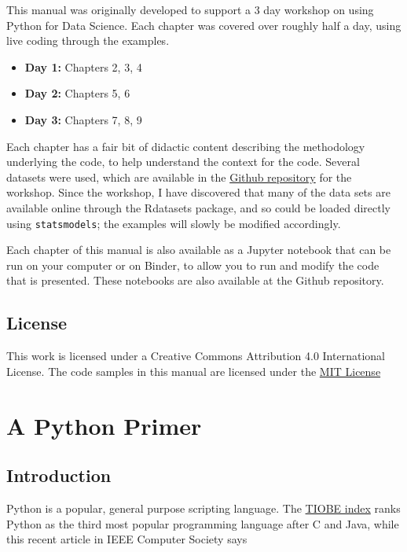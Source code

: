 \documentclass[
  letterpaper,
]{scrbook}
\providecommand{\tightlist}{%
  \setlength{\itemsep}{0pt}\setlength{\parskip}{0pt}}
\begin{document}
This manual was originally developed to support a 3 day workshop on using Python for Data Science. Each chapter was covered over roughly half a day, using live coding through the examples.

\begin{itemize}
\tightlist
\item
  \textbf{Day 1: } Chapters 2, 3, 4
\item
  \textbf{Day 2: } Chapters 5, 6
\item
  \textbf{Day 3: } Chapters 7, 8, 9
\end{itemize}

Each chapter has a fair bit of didactic content describing
the methodology underlying the code, to help understand the
context for the code. Several datasets were used, which are
available in the \href{https://www.github.com/araastat/BIOF085.git}{Github repository} for the workshop. Since the workshop, I have discovered that many
of the data sets are available online through the Rdatasets package, and so could be loaded directly using \texttt{statsmodels}; the examples will slowly be modified accordingly.

Each chapter of this manual is also available as a Jupyter
notebook that can be run on your computer or on Binder, to
allow you to run and modify the code that is presented. These
notebooks are also available at the Github repository.

\hypertarget{license}{%
\section{License}\label{license}}

This work is licensed under a Creative Commons Attribution 4.0 International License. The code samples in this manual are licensed under the \href{https://mit-license.org}{MIT License}

\hypertarget{a-python-primer}{%
\chapter{A Python Primer}\label{a-python-primer}}

\hypertarget{introduction}{%
\section{Introduction}\label{introduction}}

Python is a popular, general purpose scripting language. The \href{https://www.tiobe.com/tiobe-index/}{TIOBE index} ranks Python as the third most popular programming language after C and Java, while this recent article in IEEE Computer Society says
\end{document}
